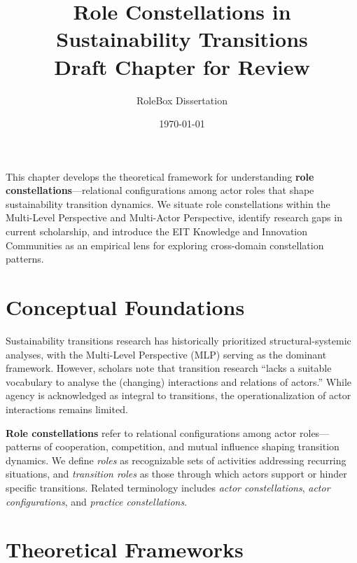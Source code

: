\documentclass[11pt,a4paper]{article}
\title{\textbf{Role Constellations in Sustainability Transitions}\\[0.5cm]
\large Draft Chapter for Review}
\author{RoleBox Dissertation}
\date{\today}
\begin{document}
\maketitle

\begin{chapteroverview}
This chapter develops the theoretical framework for understanding \textbf{role constellations}---relational configurations among actor roles that shape sustainability transition dynamics. We situate role constellations within the Multi-Level Perspective and Multi-Actor Perspective, identify research gaps in current scholarship, and introduce the EIT Knowledge and Innovation Communities as an empirical lens for exploring cross-domain constellation patterns.
\end{chapteroverview}

\tableofcontents
\newpage

\section{Conceptual Foundations}

Sustainability transitions research has historically prioritized structural-systemic analyses, with the Multi-Level Perspective (MLP) serving as the dominant framework. However, scholars note that transition research ``lacks a suitable vocabulary to analyse the (changing) interactions and relations of actors.'' While agency is acknowledged as integral to transitions, the operationalization of actor interactions remains limited.

\textbf{Role constellations} refer to relational configurations among actor roles---patterns of cooperation, competition, and mutual influence shaping transition dynamics. We define \textit{roles} as recognizable sets of activities addressing recurring situations, and \textit{transition roles} as those through which actors support or hinder specific transitions. Related terminology includes \textit{actor constellations}, \textit{actor configurations}, and \textit{practice constellations}.

\section{Theoretical Frameworks}
\end{document}
